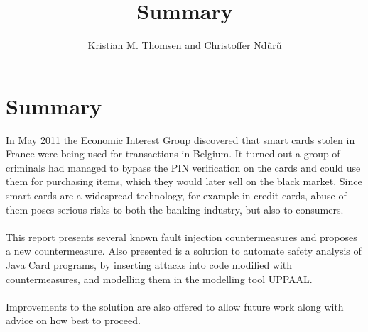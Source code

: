 \documentclass{article}
\begin{document}
\title{Summary}
\author{Kristian M. Thomsen and Christoffer Nd\~ur\~u}
\maketitle

\section{Summary}
In May 2011 the Economic Interest Group discovered that smart cards stolen in France were being used for transactions in Belgium. It turned out a group of criminals had managed to bypass the PIN verification on the cards and could use them for purchasing items, which they would later sell on the black market. Since smart cards are a widespread technology, for example in credit cards, abuse of them poses serious risks to both the banking industry, but also to consumers.\\\\
This report presents several known fault injection countermeasures and proposes a new countermeasure. Also presented is a solution to automate safety analysis of Java Card programs, by inserting attacks into code modified with countermeasures, and modelling them in the modelling tool UPPAAL.\\\\
Improvements to the solution are also offered to allow future work along with advice on how best to proceed.
\end{document}

